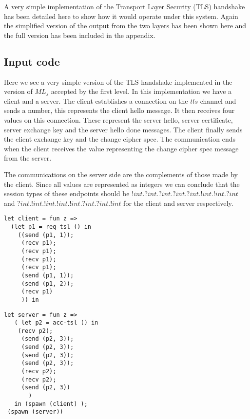 A very simple implementation of the Transport Layer Security (TLS) handshake has been detailed here to show how it would operate under this system. Again the simplified version of the output from the two layers has been shown here and the full version has been included in the appendix. 

\subsection{Input code}

Here we see a very simple version of the TLS handshake implemented in the version of $ML_s$ accepted by the first level. In this implementation we have a client and a server. The client establishes a connection on the $tls$ channel and sends a number, this represents the client hello message. It then receives four values on this connection. These represent the server hello, server certificate, server exchange key and the server hello done messages. The client finally sends the client exchange key and the change cipher spec. The communication ends when the client receives the value representing the change cipher spec message from the server. 

The communications on the server side are the complements of those made by the client. Since all values are represented as integers we can conclude that the session types of these endpoints should  be $!int.?int.?int.?int.?int.!int.!int.?int$ and $?int.!int.!int.!int.!int.?int.?int.!int$ for the client and server respectively. 


\begin{minipage}{.45\textwidth}
\begin{lstlisting}[backgroundcolor=\color{white},numbers=none]
let client = fun z =>
  (let p1 = req-tsl () in
    ((send (p1, 1));
     (recv p1);
     (recv p1);
     (recv p1);
     (recv p1);
     (send (p1, 1));
     (send (p1, 2));
     (recv p1)
     )) in
\end{lstlisting}
\end{minipage}
\hfill
\begin{minipage}{.45\textwidth}
\begin{lstlisting}[backgroundcolor=\color{white},numbers=none]
 let server = fun z =>
   ( let p2 = acc-tsl () in
    (recv p2);
     (send (p2, 3));
     (send (p2, 3));
     (send (p2, 3));
     (send (p2, 3));
     (recv p2);
     (recv p2);
     (send (p2, 3))
       )
   in (spawn (client) );
 (spawn (server))
\end{lstlisting}
\end{minipage}

